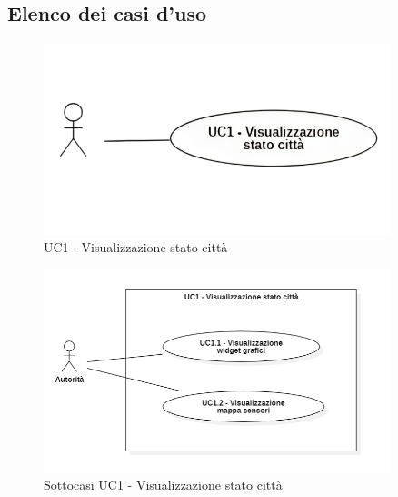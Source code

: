\subsection{Elenco dei casi d'uso}

\begin{figure}[H]
    \centering
    \includegraphics[width=0.9\textwidth]{../Images/uc1.png}
    \caption{UC1 - Visualizzazione stato città}
    \label{fig:UC1}
\end{figure}


\begin{figure}[H]
    \centering
    \includegraphics[width=0.9\textwidth]{../Images/uc1_Subcase.PNG} 
    \caption{Sottocasi UC1 - Visualizzazione stato città}
    \label{fig:UC1_sub}
\end{figure}





